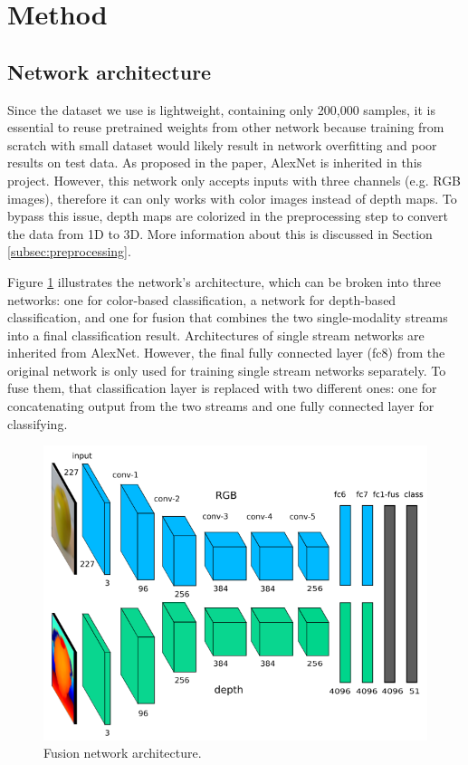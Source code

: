 \section{Method}\label{sec:method}

\subsection{Network architecture}\label{subsec:architecture}
Since the dataset we use is lightweight, containing only 200,000 samples, it is essential to reuse pretrained weights from other network because training from scratch with small dataset would likely result in network overfitting and poor results on test data. As proposed in the paper, AlexNet is inherited in this project. However, this network only accepts inputs with three channels (e.g. RGB images), therefore it can only works with color images instead of depth maps. To bypass this issue, depth maps are colorized in the preprocessing step to convert the data from 1D to 3D. More information about this is discussed in Section \ref{subsec:preprocessing}.

Figure \ref{fig:architecture} illustrates the network's architecture, which can be broken into three networks: one for color-based classification, a network for depth-based classification, and one for fusion that combines the two single-modality streams into a final classification result. Architectures of single stream networks are inherited from AlexNet. However, the final fully connected layer (fc8) from the original network is only used for training single stream networks separately. To fuse them, that classification layer is replaced with two different ones: one for concatenating output from the two streams and one fully connected layer for classifying.

\begin{figure}
	\centering
    \includegraphics[width=\linewidth]{images/architecture}
    \caption{Fusion network architecture.}
    \label{fig:architecture}
\end{figure}

